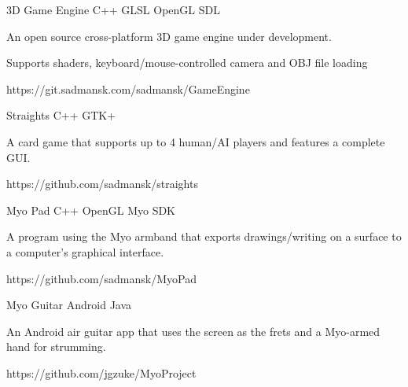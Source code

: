 



\begin{cvprojects}

\cvproject
{3D Game Engine}
{C++ \textbullet{} GLSL \textbullet{} OpenGL \textbullet{} SDL}
{
An open source cross-platform 3D game engine under development.
\begin{cvitems}
\item[]
\item {Supports shaders, keyboard/mouse-controlled camera and OBJ file loading}
\end{cvitems}
}
{https://git.sadmansk.com/sadmansk/GameEngine}


\cvproject
{Straights}
{C++ \textbullet{} GTK+}
{
    A card game that supports up to 4 human/AI players and features a complete GUI.
    \begin{cvitems}\end{cvitems} %
}
{https://github.com/sadmansk/straights}


\cvproject
{Myo Pad}
{C++ \textbullet{} OpenGL \textbullet{} Myo SDK}
{
A program using the Myo armband that exports drawings/writing on a surface to a computer's graphical interface.
    \begin{cvitems}\end{cvitems} %
}
{https://github.com/sadmansk/MyoPad}


\cvproject
{Myo Guitar}
{Android \textbullet{} Java}
{
An Android air guitar app that uses the screen as the frets and a Myo-armed hand for strumming.
    \begin{cvitems}\end{cvitems} %
}
{https://github.com/jgzuke/MyoProject}


\end{cvprojects}
